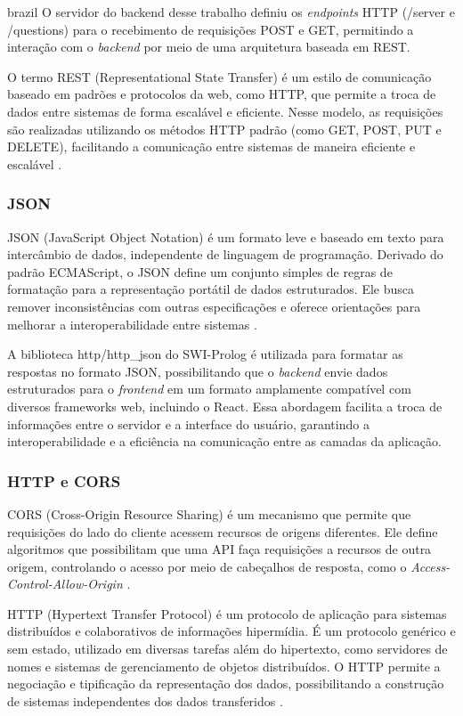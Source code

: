\begin{otherlanguage*}{brazil}
O servidor do backend desse trabalho definiu os \textit{endpoints} HTTP (/server e /questions) para o recebimento de requisições POST e GET, permitindo a interação com o \textit{backend} por meio de uma arquitetura baseada em REST. 

O termo REST (Representational State Transfer) é um estilo de comunicação baseado em padrões e protocolos da web, como HTTP, que permite a troca de dados entre sistemas de forma escalável e eficiente. Nesse modelo, as requisições são realizadas utilizando os métodos HTTP padrão (como GET, POST, PUT e DELETE), facilitando a comunicação entre sistemas de maneira eficiente e escalável \cite{whatisrest}.

\subsubsection{JSON}

JSON (JavaScript Object Notation) é um formato leve e baseado em texto para intercâmbio de dados, independente de linguagem de programação. Derivado do padrão ECMAScript, o JSON define um conjunto simples de regras de formatação para a representação portátil de dados estruturados. Ele busca remover inconsistências com outras especificações e oferece orientações para melhorar a interoperabilidade entre sistemas \cite{whatisjson}.

A biblioteca http/http\_json do SWI-Prolog é utilizada para formatar as respostas no formato JSON, possibilitando que o \textit{backend} envie dados estruturados para o \textit{frontend} em um formato amplamente compatível com diversos frameworks web, incluindo o React. Essa abordagem facilita a troca de informações entre o servidor e a interface do usuário, garantindo a interoperabilidade e a eficiência na comunicação entre as camadas da aplicação.

\subsubsection{HTTP e CORS}

CORS (Cross-Origin Resource Sharing) é um mecanismo que permite que requisições do lado do cliente acessem recursos de origens diferentes. Ele define algoritmos que possibilitam que uma API faça requisições a recursos de outra origem, controlando o acesso por meio de cabeçalhos de resposta, como o \textit{Access-Control-Allow-Origin} \cite{whatiscors}.

HTTP (Hypertext Transfer Protocol) é um protocolo de aplicação para sistemas distribuídos e colaborativos de informações hipermídia. É um protocolo genérico e sem estado, utilizado em diversas tarefas além do hipertexto, como servidores de nomes e sistemas de gerenciamento de objetos distribuídos. O HTTP permite a negociação e tipificação da representação dos dados, possibilitando a construção de sistemas independentes dos dados transferidos \cite{whatishttp}.


\end{otherlanguage*}

